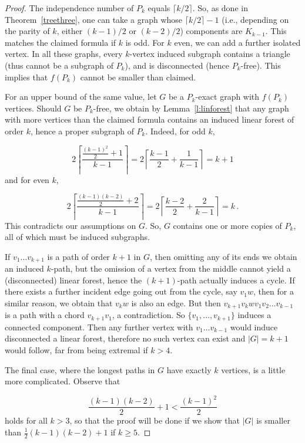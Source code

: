 \documentclass[10pt,a4paper]{amsart}
\begin{document}
\begin{proof}
	The independence number of $P_k$ equals $\lceil k/2 \rceil$.
	So, as done in Theorem~\ref{treethree}, one can take a graph whose $\lceil k/2 \rceil-1$ (i.e., depending on the parity of $k$, either $(k-1)/2$ or $(k-2)/2$) components are $K_{k-1}$.
	This matches the claimed formula if $k$ is odd.
	For $k$ even, we can add a further isolated vertex.
	In all these graphs, every $k$-vertex induced subgraph contains a triangle (thus cannot be a subgraph of $P_k$), and is disconnected (hence $P_k$-free).
	This implies that $f(P_k)$ cannot be smaller than claimed.
	
	For an upper bound of the same value, let $G$ be a $P_k$-exact graph with $f(P_k)$ vertices.
	Should $G$ be $P_k$-free, we obtain by Lemma~\ref{l:linforest} that any graph with more vertices than the claimed formula contains an induced linear forest of order $k$, hence a proper subgraph of $P_k$.
	Indeed, for odd $k$,
	
	$$
	  2\left\lceil \frac{\frac{(k-1)^2}{2}+1}{k-1} \right\rceil = 2 \left\lceil \frac{k-1}{2} + \frac{1}{k-1} \right\rceil = k+1
	$$
	and for even $k$,
	
	$$
	  2\left\lceil \frac{\frac{(k-1)(k-2)}{2}+2}{k-1} \right\rceil = 2 \left\lceil \frac{k-2}{2} + \frac{2}{k-1} \right\rceil = k \,.
	$$	
	This contradicts our assumptions on $G$.
	So, $G$ contains one or more copies of $P_k$, all of which must be induced subgraphs.
	
	If $v_1\dots v_{k+1}$ is a path of order $k+1$ in $G$, then omitting any of its ends we obtain an induced $k$-path, but the omission of a vertex from the middle cannot yield a (disconnected) linear forest, hence the $(k+1)$-path actually induces a cycle.
	If there exists a further incident edge going out from the cycle, say $v_1w$, then for a similar reason, we obtain that $v_kw$ is also an edge.
	But then $v_{k+1}v_kwv_1v_2\dots v_{k-1}$ is a path with a chord $v_{k+1}v_1$, a contradiction.
	So $\{v_1,\dots,v_{k+1}\}$ induces a connected component.
	Then any further vertex with $v_1\dots v_{k-1}$ would induce disconnected a linear forest, therefore no such vertex can exist and $|G|=k+1$ would follow, far from being extremal if $k>4$.
	
	The final case, where the longest paths in $G$ have exactly $k$ vertices, is a little more complicated.
	Observe that
	
	$$
	  \frac{(k-1)(k-2)}{2}+1 < \frac{(k-1)^2}{2}
	$$
	holds for all $k>3$, so that the proof will be done if we show that $|G|$ is smaller than $\frac{1}{2}(k-1)(k-2)+1$ if $k\geq 5$.
	

\end{proof}
\end{document}
